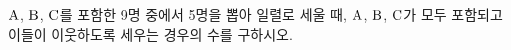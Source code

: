 $\mathrm{A}$, $\mathrm{B}$, $\mathrm{C}$를 포함한 9명 중에서 5명을 뽑아 일렬로 세울 때, $\mathrm{A}$, $\mathrm{B}$, $\mathrm{C}$가 모두 포함되고 이들이 이웃하도록 세우는 경우의 수를 구하시오.
